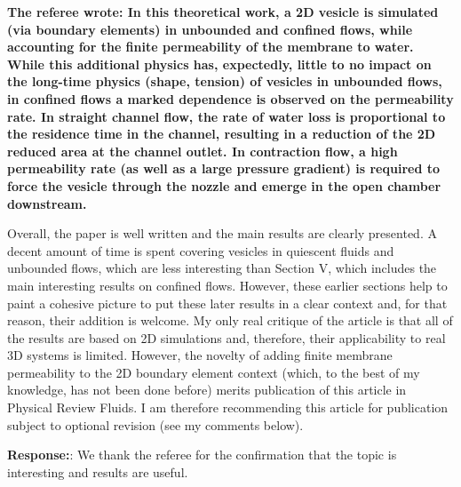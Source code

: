 \documentclass[12pt]{article}
\begin{document}
{\bf The referee wrote:
In this theoretical work, a 2D vesicle is simulated (via boundary elements) in unbounded and confined flows, while accounting for the finite permeability of the membrane to water. While this additional physics has, expectedly, little to no impact on the long-time physics (shape, tension) of vesicles in unbounded flows, in confined flows a marked dependence is observed on the permeability rate. In straight channel flow, the rate of water loss is proportional to the residence time in the channel, resulting in a reduction of the 2D reduced area at the channel outlet. In contraction flow, a high permeability rate (as well as a large pressure gradient) is required to force the vesicle through the nozzle and emerge in the open chamber downstream.

Overall, the paper is well written and the main results are clearly presented. A decent amount of time is spent covering vesicles in quiescent fluids and unbounded flows, which are less interesting than Section V, which includes the main interesting results on confined flows. However, these earlier sections help to paint a cohesive picture to put these later results in a clear context and, for that reason, their addition is welcome. My only real critique of the article is that all of the results are based on 2D simulations and, therefore, their applicability to real 3D systems is limited. However, the novelty of adding finite membrane permeability to the 2D boundary element context (which, to the best of my knowledge, has not been done before) merits publication of this article in Physical Review Fluids. I am therefore recommending this article for publication subject to optional revision (see my comments below).}


\noindent
{\bf Response:}: We thank the referee for the confirmation that the topic is interesting and results are useful.
\end{document}
